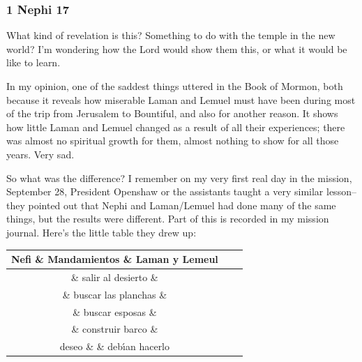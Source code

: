	\subsubsection{1 Nephi 17} %

		\begin{compactdesc}
		
		\item[14$\vert$]
		\begin{compactdesc}
		\item[ye shall know that I, the Lord, am God] What kind of revelation is this? Something to do with the temple in the new world? I'm wondering how the Lord would show them this, or what it would be like to learn.
		\end{compactdesc}

		\item[21$\vert$]
		\begin{compactdesc}
		\item[and we might have been happy] In my opinion, one of the saddest things uttered in the Book of Mormon, both because it reveals how miserable Laman and Lemuel must have been during most of the trip from Jerusalem to Bountiful, and also for another reason. It shows how little Laman and Lemuel changed as a result of all their experiences; there was almost no spiritual growth for them, almost nothing to show for all those years. Very sad.

		So what was the difference? I remember on my very first real day in the mission, September 28, President Openshaw or the assistants taught a very similar lesson--they pointed out that Nephi and Laman/Lemuel had done many of the same things, but the results were different. Part of this is recorded in my mission journal. Here's the little table they drew up:

		\begin{tabular}{|c|c|c|}
		\hline Nefi \& Mandamientos \& Laman y Lemeul \\ 
		\hline \ding{51} \& salir al desierto \& \ding{51} \\ 
		\hline \ding{51} \& buscar las planchas \& \ding{51} \\ 
		\hline \ding{51} \& buscar esposas \& \ding{51} \\ 
		\hline \ding{51} \& construir barco \& \ding{51} \\ 
		\hline deseo \& \& deb\'{\i}an hacerlo \\ 
		\hline 
		\end{tabular}


\end{compactdesc}
\end{compactdesc}
